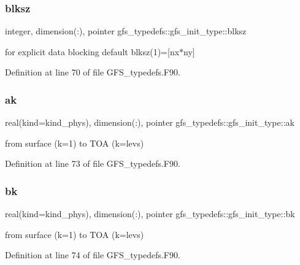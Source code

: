 \subsubsection{blksz}
{\footnotesize\ttfamily integer, dimension(\+:), pointer gfs\+\_\+typedefs\+::gfs\+\_\+init\+\_\+type\+::blksz}



for explicit data blocking default blksz(1)=[nx$\ast$ny] 



Definition at line 70 of file G\+F\+S\+\_\+typedefs.\+F90.

\mbox{\label{structgfs__typedefs_1_1gfs__init__type_a15e2ce352e7e5f92f9b4c0f29f8b2d3f}} 
\subsubsection{ak}
{\footnotesize\ttfamily real(kind=kind\+\_\+phys), dimension(\+:), pointer gfs\+\_\+typedefs\+::gfs\+\_\+init\+\_\+type\+::ak}



from surface (k=1) to T\+OA (k=levs) 



Definition at line 73 of file G\+F\+S\+\_\+typedefs.\+F90.

\mbox{\label{structgfs__typedefs_1_1gfs__init__type_ac65baae59281ccf2859c6e9e9e66071c}} 
\subsubsection{bk}
{\footnotesize\ttfamily real(kind=kind\+\_\+phys), dimension(\+:), pointer gfs\+\_\+typedefs\+::gfs\+\_\+init\+\_\+type\+::bk}



from surface (k=1) to T\+OA (k=levs) 



Definition at line 74 of file G\+F\+S\+\_\+typedefs.\+F90.

\mbox{\label{structgfs__typedefs_1_1gfs__init__type_a9a4ed14b3045a717322f0bf36167c0aa}} 
